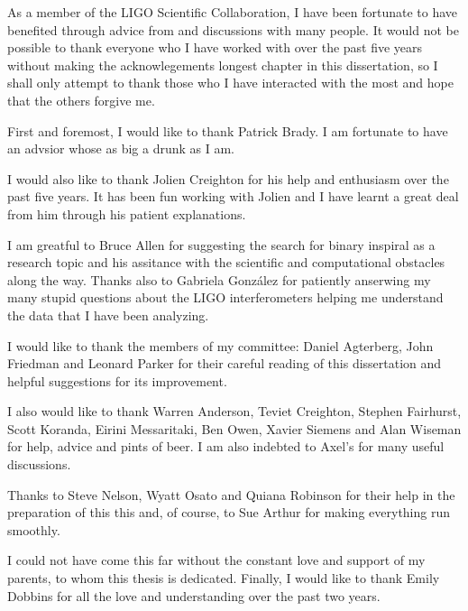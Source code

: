 
As a member of the LIGO Scientific Collaboration, I have been fortunate to
have benefited through advice from and discussions with many people. It would
not be possible to thank everyone who I have worked with over the past five
years without making the acknowlegements longest chapter in this dissertation,
so I shall only attempt to thank those who I have interacted with the most and
hope that the others forgive me.

First and foremost, I would like to thank Patrick Brady. I am fortunate to
have an advsior whose as big a drunk as I am.

I would also like to thank Jolien Creighton for his help and enthusiasm over
the past five years. It has been fun working with Jolien and I have learnt a
great deal from him through his patient explanations.

I am greatful to Bruce Allen for suggesting the search for binary inspiral as
a research topic and his assitance with the scientific and computational
obstacles along the way. Thanks also to Gabriela Gonz\'{a}lez for patiently
anserwing my many stupid questions about the LIGO interferometers helping me
understand the data that I have been analyzing.

I would like to thank the members of my committee: Daniel Agterberg, John
Friedman and Leonard Parker for their careful reading of this dissertation and
helpful suggestions for its improvement.

I also would like to thank Warren Anderson, Teviet Creighton, Stephen
Fairhurst, Scott Koranda, Eirini Messaritaki, Ben Owen, Xavier Siemens and
Alan Wiseman for help, advice and pints of beer. I am also indebted to Axel's
for many useful discussions.

Thanks to Steve Nelson, Wyatt Osato and Quiana Robinson for their help in the
preparation of this this and, of course, to Sue Arthur for making everything
run smoothly.

I could not have come this far without the constant love and support of my
parents, to whom this thesis is dedicated. Finally, I would like to thank
Emily Dobbins for all the love and understanding over the past two years.
